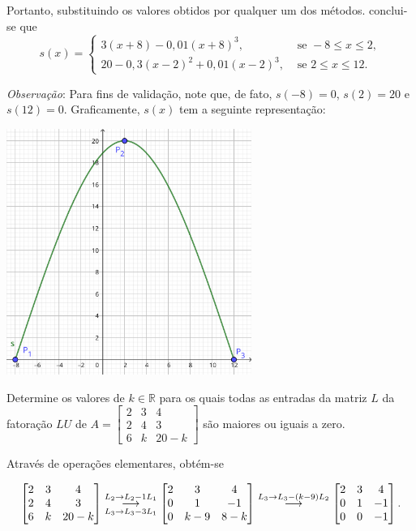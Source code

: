 \documentclass[12pt,a4paper]{article}
\newcommand*\R{\mathbb{R}}
\newcommand{\grstep}[2][\relax]{%
   \ensuremath{\mathrel{
       {\mathop{\longrightarrow}\limits^{#2\mathstrut}_{
                                     \begin{subarray}{l} #1 \end{subarray}}}}}}
\begin{document}
\begin{ExerciseList}
Portanto, substituindo os valores obtidos por qualquer um dos métodos. conclui-se que
\[
\boxed{
  s(x) =
  \begin{cases}
    3 (x + 8) - 0,01(x + 8)^3, & \text{ se } -8 \leq x \leq 2,\\
    20 - 0,3(x - 2)^2 + 0,01(x - 2)^3, & \text{ se } 2 \leq x \leq 12.
  \end{cases}
}
\]


\textit{Observação}: Para fins de validação, note que, de fato, $s(-8) = 0$, $s(2) = 20$ e $s(12) = 0$. Graficamente, $s(x)$ tem a seguinte representação:

\begin{center}
  \includegraphics[width=8.0cm]{img/prova-2-cci-spline-de-ordem-3-natural.pdf}
\end{center}


\Exercise[title={2,0}] Determine os valores de $k \in \R$ para os quais todas as entradas da matriz $L$ da fatoração $LU$ de $A=\begin{bmatrix}
  2 & 3 & 4 \\
  2 & 4 & 3 \\
  6 & k & 20 -k
\end{bmatrix}$ são maiores ou iguais a zero.

\Answer Através de operações elementares, obtém-se

\[
\begin{bmatrix}
  2 & 3 & 4 \\
  2 & 4 & 3 \\
  6 & k & 20 -k
\end{bmatrix}
\grstep[L_3 \to L_3 -3 L_1]{L_2 \to L_2 - 1 L_1}
\begin{bmatrix}
  2 & 3 & 4 \\
  0 & 1 & -1 \\
  0 & k-9 & 8 -k
\end{bmatrix}
\grstep{L_3 \to L_3 -(k-9)L_2}
\begin{bmatrix}
  2 & 3 & 4 \\
  0 & 1 & -1 \\
  0 & 0 & -1
\end{bmatrix}.
\]


\end{ExerciseList}
\end{document}
